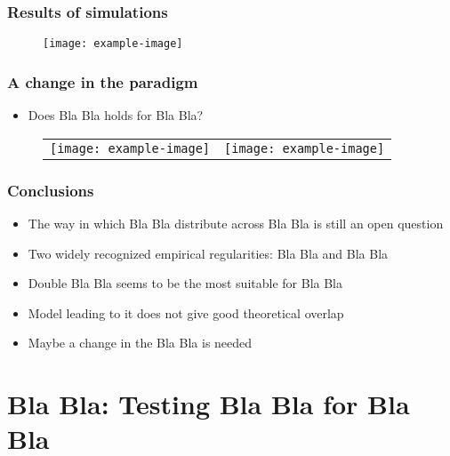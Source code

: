 \documentclass{beamer}
\begin{document}
\begin{frame}
\frametitle{Results of simulations}
\begin{figure}
\begin{center}
\texttt{[image: example-image]}
\end{center}
\end{figure}
\end{frame}

\begin{frame}
\frametitle{A change in the paradigm}
\begin{itemize}
\item Does Bla Bla holds for Bla Bla?
\end{itemize}
\begin{figure}
\begin{center}
\begin{tabular}{cc}
\texttt{[image: example-image]} &
\texttt{[image: example-image]}
\end{tabular}
\end{center}
\end{figure}
\end{frame}

\begin{frame}
\frametitle{Conclusions}
\begin{itemize}
\item The way in which Bla Bla distribute across Bla Bla is still an open question \pause
\item Two widely recognized empirical regularities: Bla Bla and Bla Bla \pause
\item Double Bla Bla seems to be the most suitable for Bla Bla \pause
\item Model leading to it does not give good theoretical overlap \pause
\item Maybe a change in the Bla Bla is needed
\end{itemize}
\end{frame}

\section[Bla Bla]{Bla Bla: Testing Bla Bla for Bla Bla}
\setcounter{subsection}{1}
\end{document}
